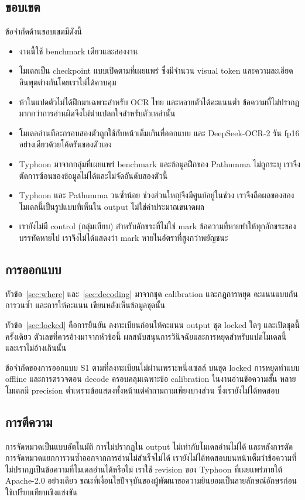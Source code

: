 \subsection{ขอบเขต}
ข้อจำกัดด้านขอบเขตมีดังนี้
\begin{itemize}
\item งานนี้ใช้ benchmark เดียวและสองงาน
\item โมเดลเป็น checkpoint แบบเปิดตามที่เผยแพร่ ซึ่งมีจำนวน visual token และความละเอียดอินพุตต่างกันโดยเราไม่ได้ควบคุม
\item ห้าในแปดตัวไม่ได้ฝึกมาเฉพาะสำหรับ OCR ไทย และหลายตัวได้คะแนนต่ำ ข้อความที่ไม่ปรากฏมากกว่าการอ่านผิดจึงไม่น่าแปลกใจสำหรับตัวเหล่านั้น
\item โมเดลอ่านทีละกรอบสองตัวถูกใช้กับหน้าเต็มเกินที่ออกแบบ และ DeepSeek-OCR-2 รัน fp16 อย่างเดียวด้วยโค้ดรันของตัวเอง
\item Typhoon มาจากกลุ่มที่เผยแพร่ benchmark และข้อมูลฝึกของ Pathumma ไม่ถูกระบุ เราจึงตัดการซ้อนของข้อมูลไม่ได้และไม่จัดอันดับสองตัวนี้
\item Typhoon และ Pathumma วนซ้ำน้อย ช่วงส่วนใหญ่จึงมีศูนย์อยู่ในช่วง เราจึงถือผลของสองโมเดลนี้เป็นรูปแบบที่เห็นใน output ไม่ใช่ค่าประมาณขนาดผล
\item เรายังไม่มี control (กลุ่มเทียบ) สำหรับอักขระที่ไม่ใช่ mark ข้อความที่หายทำให้ทุกอักขระของบรรทัดหายไป เราจึงไม่ได้แสดงว่า mark หายในอัตราที่สูงกว่าพยัญชนะ
\end{itemize}

\subsection{การออกแบบ}
หัวข้อ~\ref{sec:where} และ~\ref{sec:decoding} มาจากชุด calibration และกฎการหยุด คะแนนแบบกันการวนซ้ำ และการให้คะแนน เขียนหลังเห็นข้อมูลชุดนั้น

หัวข้อ~\ref{sec:locked} คือการยืนยัน ลงทะเบียนก่อนให้คะแนน output ชุด locked ใดๆ และเปิดชุดนี้ครั้งเดียว ตัวเลขที่ควรอ้างมาจากหัวข้อนี้ ผลสนับสนุนการวินิจฉัยและการหยุดสำหรับแปดโมเดลนี้ และเราไม่อ้างเกินนั้น

ข้อจำกัดของการออกแบบ S1 ตามที่ลงทะเบียนไม่ผ่านเพราะหนึ่งเซลล์ บนชุด locked การหยุดทำแบบ offline และการตรวจตอน decode ครอบคลุมเฉพาะข้อ calibration ในงานอ่านข้อความสั้น หลายโมเดลมี precision ต่ำเพราะข้อแสดงทั้งหน้าแต่คำถามถามเพียงบางส่วน ซึ่งเรายังไม่ได้ทดสอบ

\subsection{การตีความ}
การจัดหมวดเป็นแบบอัตโนมัติ การไม่ปรากฏใน output ไม่เท่ากับโมเดลอ่านไม่ได้ และหลังการตัด การจัดหมวดแยกการวนซ้ำออกจากการอ่านไม่สำเร็จไม่ได้ เรายังไม่ได้ทดสอบบนหน้าเต็มว่าข้อความที่ไม่ปรากฏเป็นข้อความที่โมเดลอ่านได้หรือไม่
เราใช้ revision ของ Typhoon ที่เผยแพร่ภายใต้ Apache-2.0 อย่างเดียว ขณะที่เงื่อนไขปัจจุบันของผู้พัฒนาขอความยินยอมเป็นลายลักษณ์อักษรก่อนใช้เปรียบเทียบเชิงแข่งขัน

